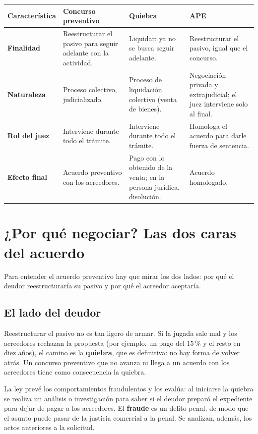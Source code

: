 \documentclass[12pt,oneside]{book}
\begin{document}
\begin{table}[H]
\centering
\small
\begin{tabularx}{\textwidth}{
    >{\raggedright\arraybackslash}p{}
    >{\raggedright\arraybackslash}X
    >{\raggedright\arraybackslash}X
    >{\raggedright\arraybackslash}X
}
\toprule
\textbf{Característica} & \textbf{Concurso preventivo} & \textbf{Quiebra} & \textbf{APE} \\
\midrule
\textbf{Finalidad} & Reestructurar el pasivo para seguir adelante con la actividad. & Liquidar: ya no se busca seguir adelante. & Reestructurar el pasivo, igual que el concurso. \\
\textbf{Naturaleza} & Proceso colectivo, judicializado. & Proceso de liquidación colectivo (venta de bienes). & Negociación privada y extrajudicial; el juez interviene solo al final. \\
\textbf{Rol del juez} & Interviene durante todo el trámite. & Interviene durante todo el trámite. & Homologa el acuerdo para darle fuerza de sentencia. \\
\textbf{Efecto final} & Acuerdo preventivo con los acreedores. & Pago con lo obtenido de la venta; en la persona jurídica, disolución. & Acuerdo homologado. \\
\bottomrule
\end{tabularx}
\end{table}

\section{¿Por qué negociar? Las dos caras del acuerdo}

Para entender el acuerdo preventivo hay que mirar los dos lados: por qué el deudor reestructuraría su pasivo y por qué el acreedor aceptaría.

\subsection{El lado del deudor}

Reestructurar el pasivo no es tan ligero de armar. Si la jugada sale mal y los acreedores rechazan la propuesta (por ejemplo, un pago del 15\,\% y el resto en diez años), el camino es la \textbf{quiebra}, que es definitiva: no hay forma de volver atrás. Un concurso preventivo que no avanza ni llega a un acuerdo con los acreedores tiene como consecuencia la quiebra.

La ley prevé los comportamientos fraudulentos y los evalúa: al iniciarse la quiebra se realiza un análisis o investigación para saber si el deudor preparó el expediente para dejar de pagar a los acreedores. El \textbf{fraude} es un delito penal, de modo que el asunto puede pasar de la justicia comercial a la penal. Se analizan, además, los actos anteriores a la solicitud.
\end{document}
